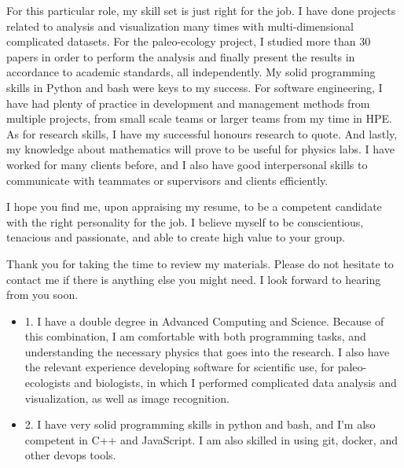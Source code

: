 \documentclass[11pt, a4paper]{awesome-cv}
\begin{document}
\begin{cvletter}
For this particular role, my skill set is just right for the job. I have done projects related to analysis and visualization many times with multi-dimensional complicated datasets. For the paleo-ecology project, I studied more than 30 papers in order to perform the analysis and finally present the results in accordance to academic standards, all independently. My solid programming skills in Python and bash were keys to my success. For software engineering, I have had plenty of practice in development and management methods from multiple projects, from small scale teams or larger teams from my time in HPE. As for research skills, I have my successful honours research to quote. And lastly, my knowledge about mathematics will prove to be useful for physics labs. I have worked for many clients before, and I also have good interpersonal skills to communicate with teammates or supervisors and clients efficiently.

I hope you find me, upon appraising my resume, to be a competent candidate with the right personality for the job. I believe myself to be conscientious, tenacious and passionate, and able to create high value to your group.

Thank you for taking the time to review my materials. Please do not hesitate to contact me if there is anything else you might need. I look forward to hearing from you soon.


\begin{itemize}
\item 
1. I have a double degree in Advanced Computing and Science. Because of this combination, I am comfortable with both programming tasks, and understanding the necessary physics that goes into the research. I also have the relevant experience developing software for scientific use, for paleo-ecologists and biologists, in which I performed complicated data analysis and visualization, as well as image recognition.
\item 
2. I have very solid programming skills in python and bash, and I’m also competent in C++ and JavaScript. I am also skilled in using git, docker, and other devops tools. 


\end{itemize}
\end{cvletter}
\end{document}
